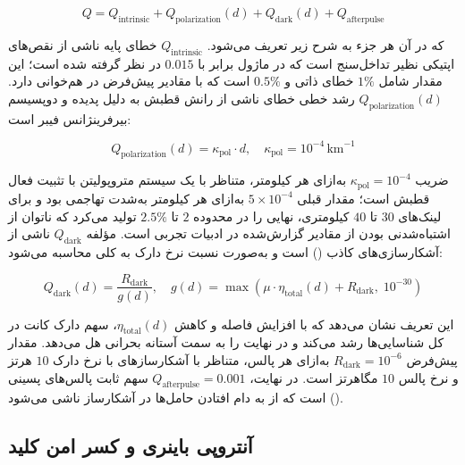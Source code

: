 \begin{equation}
	Q = Q_{\text{intrinsic}} + Q_{\text{polarization}}(d) + Q_{\text{dark}}(d) + Q_{\text{afterpulse}}
\end{equation}

که در آن هر جزء به شرح زیر تعریف می‌شود. $Q_{\text{intrinsic}}$ خطای پایه ناشی از نقص‌های اپتیکی نظیر  تداخل‌سنج است که در ماژول برابر با $0.015$ در نظر گرفته شده است؛ این مقدار شامل $1\%$ خطای ذاتی و $0.5\%$  است که با مقادیر پیش‌فرض  در  هم‌خوانی دارد. $Q_{\text{polarization}}(d)$ رشد خطی خطای ناشی از رانش قطبش به دلیل پدیده  و دوپسیسم بیرفرینژانس فیبر است:

\begin{equation}
	Q_{\text{polarization}}(d) = \kappa_{\text{pol}} \cdot d, \quad \kappa_{\text{pol}} = 10^{-4} \,\text{km}^{-1}
\end{equation}

ضریب $\kappa_{\text{pol}} = 10^{-4}$ به‌ازای هر کیلومتر، متناظر با یک سیستم  متروپولیتن با تثبیت فعال قطبش است؛ مقدار قبلی $5 \times 10^{-4}$ به‌ازای هر کیلومتر به‌شدت تهاجمی بود و برای لینک‌های $30$ تا $40$ کیلومتری،  نهایی را در محدوده $2$ تا $2.5\%$ تولید می‌کرد که ناتوان از اشتباه‌شدنی بودن از مقادیر گزارش‌شده در ادبیات تجربی است. مؤلفه $Q_{\text{dark}}$ ناشی از آشکارسازی‌های کاذب () است و به‌صورت نسبت نرخ دارک به  کلی محاسبه می‌شود:

\begin{equation}
	Q_{\text{dark}}(d) = \frac{R_{\text{dark}}}{g(d)}, \quad g(d) = \max\left(\mu \cdot \eta_{\text{total}}(d) + R_{\text{dark}},\; 10^{-30}\right)
\end{equation}

این تعریف نشان می‌دهد که با افزایش فاصله و کاهش $\eta_{\text{total}}(d)$، سهم دارک کانت در کل شناسایی‌ها رشد می‌کند و در نهایت  را به سمت آستانه بحرانی هل می‌دهد. مقدار پیش‌فرض $R_{\text{dark}} = 10^{-6}$ به‌ازای هر پالس، متناظر با آشکارسازهای  با نرخ دارک $10$ هرتز و نرخ پالس $10$ مگاهرتز است. در نهایت، $Q_{\text{afterpulse}} = 0.001$ سهم ثابت پالس‌های پسینی () است که از به دام افتادن حامل‌ها در آشکارساز ناشی می‌شود.

\subsection{آنتروپی باینری و کسر امن کلید}

